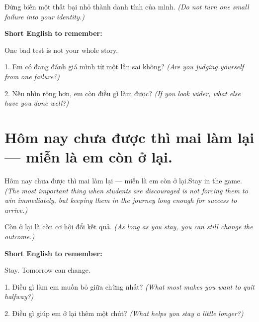 \begin{baihoc}
Đừng biến một thất bại nhỏ thành danh tính của mình.
\textit{(Do not turn one small failure into your identity.)}
\end{baihoc}

\begin{ghinhoanh}
\textbf{Short English to remember:}

One bad test is not your whole story.

\end{ghinhoanh}

\begin{tuhocnhanh}
1. Em có đang đánh giá mình từ một lần sai không? \textit{(Are you judging yourself from one failure?)}

2. Nếu nhìn rộng hơn, em còn điều gì làm được? \textit{(If you look wider, what else have you done well?)}
\end{tuhocnhanh}
\ngancach


\section{Hôm nay chưa được thì mai làm lại — miễn là em còn ở lại.}
\begin{truyen}{Hôm nay chưa được thì mai làm lại — miễn là em còn ở lại.}{Stay in the game.}
\textit{(The most important thing when students are discouraged is not forcing them to win immediately, but keeping them in the journey long enough for success to arrive.)}
\end{truyen}

\begin{baihoc}
Còn ở lại là còn cơ hội đổi kết quả.
\textit{(As long as you stay, you can still change the outcome.)}
\end{baihoc}

\begin{ghinhoanh}
\textbf{Short English to remember:}

Stay. Tomorrow can change.

\end{ghinhoanh}

\begin{tuhocnhanh}
1. Điều gì làm em muốn bỏ giữa chừng nhất? \textit{(What most makes you want to quit halfway?)}

2. Điều gì giúp em ở lại thêm một chút? \textit{(What helps you stay a little longer?)}
\end{tuhocnhanh}
\ngancach


